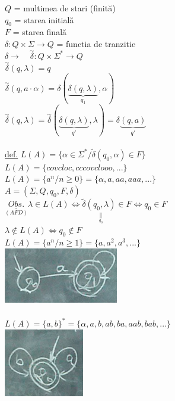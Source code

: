 \documentclass[12pt]{extarticle}
\begin{document}
{		$Q$ = multimea de stari (finită) \\
		$q_{0}$ = starea initială \\
		$F$ = starea finală \\
		$\delta : Q \times \Sigma \rightarrow Q$ = functia de tranzitie \\
		$\delta \rightarrow \quad \overset{\sim}{\delta} : Q \times \Sigma^{*} \rightarrow Q $ \\
		$\overset{\sim}{\delta}(q, \lambda) = q$ \\
		$\overset{\sim}{\delta}(q, a \cdot \alpha) = \delta (\underset{q_{1}}{\underbrace{\delta(q, \lambda)}}, \alpha)$ \\
		$\overset{\sim}{\delta}(q, \lambda) = \overset{\sim}{\delta}(\underset{q'}{\underbrace{\delta(q, \lambda)}}, \lambda) = \delta\underset{q'}{\underbrace{(q, a)}}$ \\
		\\
		\underline{def.} $L(A) = \{ \alpha \in \Sigma^{*} / \widetilde{\delta}(q_{0}, \alpha) \in F \}$ \\
		$L(A) = \{ covcloc, cccovclooo, ... \}$ \\
		$L(A) = \{ a^{n} / n \geq 0 \} = \{ \alpha, a, aa, aaa, ... \}$ \\
		$A = (\Sigma, Q, q_{0}, F, \delta)$ \\
		$\underset{(AFD)}{\underline{Obs.}} \lambda \in L(A) \Leftrightarrow \widetilde{\delta}\underset{\underset{q_{0}}{\parallel}}{(q_{0}, \lambda)} \in F \Leftrightarrow q_{0} \in F$ \\
		$\lambda \notin L(A) \Leftrightarrow q_{0} \notin F$ \\
		$L(A) = \{ a^{n} / n \geq 1 \} = \{ a, a^{2}, a^{3}, ... \}$ \\
		\includegraphics[width=5cm]{figura2.png} \\
		\\
		$L(A) = \{ a, b \}^{*} = \{ \alpha, a, b, ab, ba, aab, bab, ... \}$ \\
		\includegraphics[width=3.5cm]{figura3.png} \\
}
\end{document}
